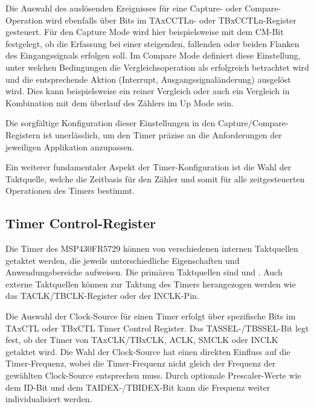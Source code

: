 Die Auswahl des ausl\"osenden Ereignisses f\"ur eine Capture- oder Compare-Operation wird ebenfalls \"uber Bits im TAxCCTLn- oder TBxCCTLn-Register gesteuert. F\"ur den Capture Mode wird hier beispielsweise mit dem CM-Bit festgelegt, ob die Erfassung bei einer steigenden, fallenden oder beiden Flanken des Eingangssignals erfolgen soll. Im Compare Mode definiert diese Einstellung, unter welchen Bedingungen die Vergleichsoperation als erfolgreich betrachtet wird und die entsprechende Aktion (Interrupt, Ausgangssignal\"anderung) ausgel\"ost wird. Dies kann beispielsweise ein reiner Vergleich oder auch ein Vergleich in Kombination mit dem \"uberlauf des Z\"ahlers im Up Mode sein. 

Die sorgf\"altige Konfiguration dieser Einstellungen in den Capture/Compare-Registern ist unerl\"asslich, um den Timer pr\"azise an die Anforderungen der jeweiligen Applikation anzupassen.

Ein weiterer fundamentaler Aspekt der Timer-Konfiguration ist \ua die Wahl der Taktquelle, welche die Zeitbasis f\"ur den Z\"ahler und somit f\"ur alle zeitgesteuerten Operationen des Timers bestimmt. \AI

\newpage
\subsection{Timer Control-Register}
\label{TimerControlRegister}

Die Timer des MSP430FR5729 k\"onnen von verschiedenen internen Taktquellen getaktet werden, die jeweils unterschiedliche Eigenschaften und Anwendungsbereiche aufweisen. Die prim\"aren Taktquellen sind  und . Auch externe Taktquellen k\"onnen zur Taktung des Timers herangezogen werden wie \zB das TACLK/TBCLK-Register oder der INCLK-Pin. 

Die Auswahl der Clock-Source f\"ur einen Timer erfolgt \"uber spezifische Bits im TAxCTL oder TBxCTL Timer Control Register. Das TASSEL-/TBSSEL-Bit legt fest, ob der Timer von TAxCLK/TBxCLK, ACLK, SMCLK oder INCLK getaktet wird. Die Wahl der Clock-Source hat einen direkten Einfluss auf die Timer-Frequenz, wobei die Timer-Frequenz nicht gleich der Frequenz der gew\"ahlten Clock-Source entsprechen muss. Durch optionale Prescaler-Werte wie dem ID-Bit und dem TAIDEX-/TBIDEX-Bit kann die Frequenz weiter individualisiert werden. 


